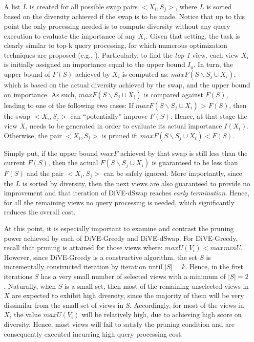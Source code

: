 A list $L$ is created for all possible swap pairs $<X_i, S_j>$, where $L$ is sorted based on the diversity achieved if the swap is to be made. 
%
%
Notice that up to this point the only processing needed is to compute diversity without any query execution to evaluate the importance of any $X_i$. 
%
%
Given that setting, the task is clearly similar to top-k query processing, for which numerous optimization techniques are proposed (e.g., \cite{Fagin:2003:CTK:644108.644113, Ilyas:2008:STK:1391729.1391730}).
%
Particularly, to find the {\em top-1} view, each view $X_i$ is initially assigned an importance equal to the upper bound $I_u$. 
%
In turn, the upper bound of $F\left(S\right)$ achieved by $X_i$ is computed as: $maxF(S \backslash S_j \cup X_i)$, which is based on the actual diversity achieved by the swap, and the upper bound on importance.
%
As such, $maxF(S \backslash S_j \cup X_i)$ is compared against $F(S)$, leading to one of the following two cases:
%
If $maxF(S \backslash S_j \cup X_i)$ > $F(S)$, then the swap $<X_i, S_j>$ can ``potentially'' improve $F\left(S\right)$. 
%
Hence, at that stage the view $X_i$ needs to be generated in order to evaluate its actual importance $I(X_i)$. 
%
Otherwise, the pair $<X_i, S_j>$ is pruned if: $maxF(S \backslash S_j \cup X_i) < F(S)$.

Simply put, if the upper bound  $maxF$ achieved by that swap is still less than the current $F(S)$, then the actual $F(S \backslash S_j \cup X_i)$ is guaranteed to be less than $F(S)$ and the pair $<X_i, S_j>$ can be safely ignored. 
%
More importantly, since the $L$ is sorted by diversity, then the next views are also guaranteed to provide no improvement and that iteration of DiVE-dSwap reaches {\em early termination}.  
%
Hence, for all the remaining views no query processing is needed, which significantly reduces the overall cost. 

 At this point, it is especially important to examine and contrast the pruning power achieved by each of DiVE-Greedy and DiVE-dSwap. 
%
For DiVE-Greedy, recall that pruning is attained for those views where: $maxU(V_i) < maxminU$. 
%
However, since DiVE-Greedy is a constructive algorithm, the set $S$ is incrementally constructed iteration by iteration until $|S|=k$. 
%
Hence, in the first iterations $S$ has a very small number of selected views with a minimum of $|S|=2$. 
%
Naturally, when $S$ is a small set, then most of the remaining unselected views in $X$ are expected to exhibit high diversity, since the majority of them will be very dissimilar from the small set of views in $S$.
%
Accordingly, for most of the views in $X$, the value $maxU(V_i)$ will be relatively high, due to achieving high score on diversity. 
%
Hence, most views will fail to satisfy the pruning condition and are consequently executed incurring high query processing cost. 

